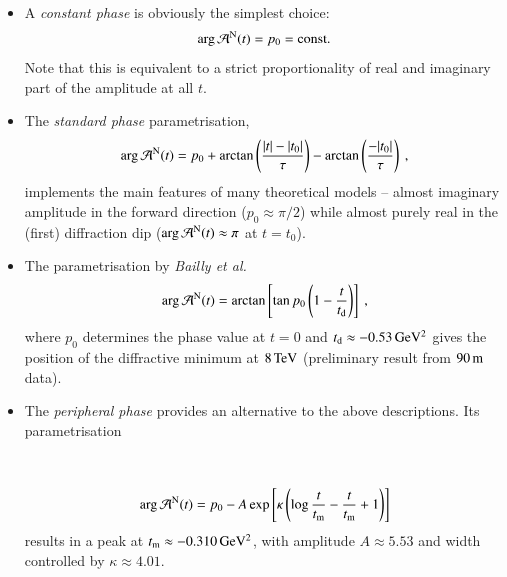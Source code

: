 \begin{itemize}
\item A {\it constant phase} is obviously the simplest choice:
%
\begin{equation}
\label{eq:nuc phase con}
\arg {\cal A}^{\rm N}(t) = p_0 = \hbox{const.}
\end{equation}
Note that this is equivalent to a strict proportionality of real and imaginary part of the amplitude at all $t$.
%
\item The {\it standard phase} parametrisation,
\begin{equation}
\label{eqn:nuc phase std}
\arg {\cal A}^{\rm N}(t) = p_{0} + \arctan \left(\frac{|t|-|t_{0}|}{\tau}\right) -  \arctan \left(\frac{-|t_{0}|}{\tau}\right) \: ,
\end{equation}
implements the main features of many theoretical models -- almost imaginary amplitude in the forward direction ($p_0 \approx \pi/2$) while almost purely real in the (first) diffraction dip 
($\arg {\cal A}^{\rm N}(t) \approx \pi$ at $t = t_{0}$). \TODO{[to be corrected]}

%
\item The parametrisation by {\em Bailly et al.}~\cite{bailly87} 
\begin{equation}
\label{eq:nuc phase bai}
	\arg {\cal A}^{\rm N}(t) = \arctan \left[ \tan p_0 \left(1 - {t\over t_{\rm d}} \right) \right]\ ,
\end{equation}
where $p_0$ determines the phase value at $t=0$ and $t_{\rm d} \approx -0.53\,{\rm GeV^2}$ gives the position of the diffractive minimum at $8\,{\rm TeV}$ (preliminary result from $90\,{\rm m}$ data).
%
\item The {\it peripheral phase} \cite{kl94}  provides an alternative to the above descriptions. Its parametrisation

\\

\begin{equation}
\label{eq:nuc phase per}
\arg {\cal A}^{\rm N}(t) = p_0 - A \exp\left[ \kappa \left( \log {t\over t_{\rm m}} - {t\over t_{\rm m}} + 1 \right) \right]
\end{equation}
results in a peak at $t_{\rm m} \approx -0.310\,{\rm GeV^2}$, with amplitude $A \approx 5.53$ and width controlled by $\kappa \approx 4.01$.
\end{itemize}

